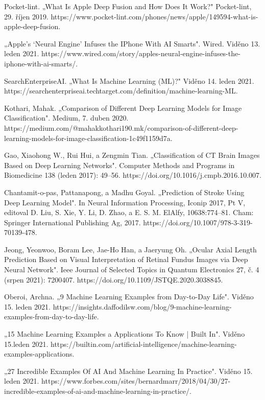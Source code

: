 \documentclass[journal]{IEEEtran}
\begin{document}
\begin{thebibliography}{1}
\bibitem{}
Pocket-lint. „What Is Apple Deep Fusion and How Does It Work?" Pocket-lint, 29. říjen 2019. https://www.pocket-lint.com/phones/news/apple/149594-what-is-apple-deep-fusion.

\bibitem{}
„Apple’s ‘Neural Engine’ Infuses the IPhone With AI Smarts". Wired. Viděno 13. leden 2021. https://www.wired.com/story/apples-neural-engine-infuses-the-iphone-with-ai-smarts/.

\bibitem{}
SearchEnterpriseAI. „What Is Machine Learning (ML)?" Viděno 14. leden 2021. https://searchenterpriseai.techtarget.com/definition/machine-learning-ML.

\bibitem{}
Kothari, Mahak. „Comparison of Different Deep Learning Models for Image Classification". Medium, 7. duben 2020. https://medium.com/@mahakkothari190.mk/comparison-of-different-deep-learning-models-for-image-classification-1c49f1159d7a.

\bibitem{}
Gao, Xiaohong W., Rui Hui, a Zengmin Tian. „Classification of CT Brain Images Based on Deep Learning Networks". Computer Methods and Programs in Biomedicine 138 (leden 2017): 49–56. https://doi.org/10.1016/j.cmpb.2016.10.007.

\bibitem{}
Chantamit-o-pas, Pattanapong, a Madhu Goyal. „Prediction of Stroke Using Deep Learning Model". In Neural Information Processing, Iconip 2017, Pt V, editoval D. Liu, S. Xie, Y. Li, D. Zhao, a E. S. M. ElAlfy, 10638:774–81. Cham: Springer International Publishing Ag, 2017. https://doi.org/10.1007/978-3-319-70139-478.


\bibitem{}
Jeong, Yeonwoo, Boram Lee, Jae-Ho Han, a Jaeryung Oh. „Ocular Axial Length Prediction Based on Visual Interpretation of Retinal Fundus Images via Deep Neural Network". Ieee Journal of Selected Topics in Quantum Electronics 27, č. 4 (srpen 2021): 7200407. https://doi.org/10.1109/JSTQE.2020.3038845.


\bibitem{}
Oberoi, Archna. „9 Machine Learning Examples from Day-to-Day Life". Viděno 15. leden 2021. https://insights.daffodilsw.com/blog/9-machine-learning-examples-from-day-to-day-life.

\bibitem{}
„15 Machine Learning Examples a Applications To Know | Built In". Viděno 15.leden 2021. https://builtin.com/artificial-intelligence/machine-learning-examples-applications.

\bibitem{}
„27 Incredible Examples Of AI And Machine Learning In Practice". Viděno 15. leden 2021. https://www.forbes.com/sites/bernardmarr/2018/04/30/27-incredible-examples-of-ai-and-machine-learning-in-practice/.


\end{thebibliography}
\end{document}
